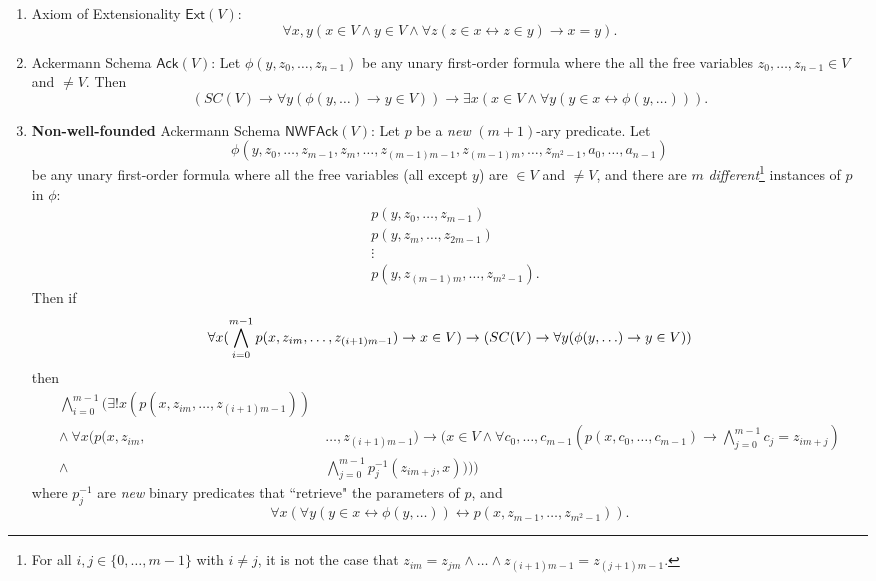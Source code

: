 \documentclass{article}
\begin{document}
\begin{enumerate}
	\item Axiom of Extensionality $\textsf{Ext}(V)$: $$\forall x, y (x \in V \wedge y \in V \wedge \forall z(z\in x \leftrightarrow z \in y) \rightarrow x = y).$$
	\item Ackermann Schema $\textsf{Ack}(V)$: Let $\phi(y, z_0, \ldots, z_{n-1})$ be any unary first-order formula where the all the free variables $z_0, \ldots, z_{n-1} \in V$ and $\ne V$. Then $$(SC(V) \rightarrow \forall y(\phi(y, \ldots) \rightarrow y \in V)) \rightarrow \exists x(x \in V \wedge \forall y(y \in x \leftrightarrow \phi(y, \ldots))).$$
    \item \textbf{Non-well-founded} Ackermann Schema $\textsf{NWFAck}(V)$: Let $p$ be a \textit{new} $(m+1)$-ary predicate. Let $$\phi(y, z_0, \ldots, z_{m-1}, z_{m}, \ldots, z_{(m-1)m-1}, z_{(m-1)m}, \ldots, z_{m^2-1}, a_0, \ldots, a_{n-1})$$ be any unary first-order formula where all the free variables (all except $y$) are $\in V$ and $\ne V$, and there are $m$ \textit{different}\footnote{For all $i,j \in \{0, \ldots, m-1\}$ with $i \ne j$, it is not the case that $z_{im} = z_{jm} \wedge \ldots \wedge z_{(i+1)m-1} = z_{(j+1)m-1}$.} instances of $p$ in $\phi$:
\begin{align*}
&p(y, z_0, \ldots, z_{m-1}) \\ &p(y, z_m, \ldots, z_{2m-1}) \\ &\vdots \\ &p(y, z_{(m-1)m}, \ldots, z_{m^2-1}).
\end{align*}
Then if
$$\forall x(\bigwedge_{i=0}^{m-1}{p(x, z_{im}, \ldots, z_{(i+1)m-1})}\rightarrow x \in V) \rightarrow \\ (SC(V) \rightarrow \forall y(\phi(y, \ldots) \rightarrow y \in V))$$
then
\begin{align*}
\bigwedge_{i=0}^{m-1}\Big(\exists!x(p(x, z_{im}, \ldots, z_{(i+1)m-1}))\ &  \\ \wedge\ \forall x(p(x, z_{im}, & \ldots, z_{(i+1)m-1}) \rightarrow (x \in V \wedge \forall c_0, \ldots, c_{m-1} (p(x, c_0, \ldots, c_{m-1}) \rightarrow \bigwedge_{j=0}^{m-1} {c_j = z_{im+j}}) \\ \wedge & \bigwedge_{j=0}^{m-1} p_j^{-1}(z_{im+j}, x)))\Big)
\end{align*}
where $p_j^{-1}$ are \textit{new} binary predicates that ``retrieve" the parameters of $p$,
and
$$\forall x (\forall y (y \in x \leftrightarrow \phi(y, \ldots)) \leftrightarrow p(x, z_{m-1}, \ldots, z_{m^2-1})).$$
\end{enumerate}
\end{document}
